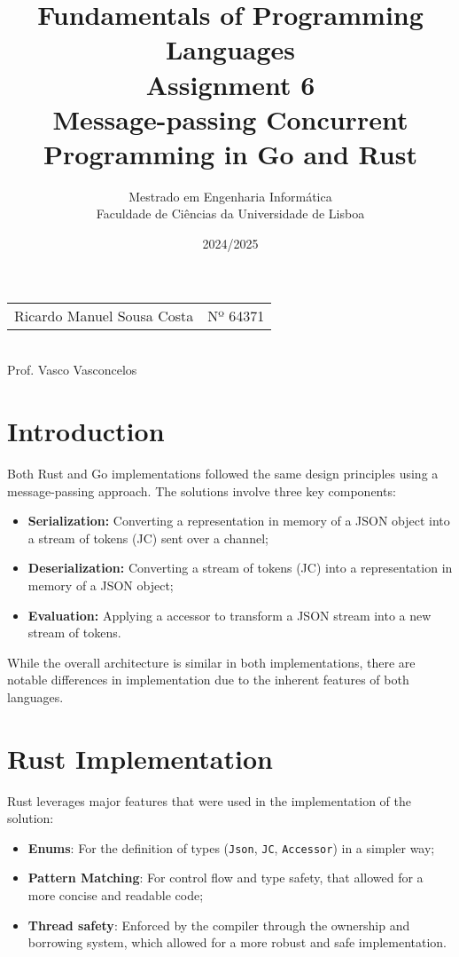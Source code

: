 \documentclass[a4paper]{article}
\title{
  Fundamentals of Programming Languages\\[1ex]
  Assignment 6\\[1ex]
  Message-passing Concurrent Programming in Go and Rust}
\author{Mestrado em Engenharia Informática\\
  Faculdade de Ciências da Universidade de Lisboa
}
\date{2024/2025}
\begin{document}
\maketitle
\setlength{\parskip}{1ex}
\thispagestyle{empty}

\begin{center}

\begin{tabular}{rl}
    Ricardo Manuel Sousa Costa & Nº 64371\\[5mm]
\end{tabular}\\

Prof. Vasco Vasconcelos

\end{center}

\clearpage

\section{Introduction}

Both Rust and Go implementations followed the same design principles using a message-passing approach.
The solutions involve three key components:

\begin{itemize}
    \item \textbf{Serialization:} Converting a representation in memory of a JSON object into a stream of tokens (JC) sent over a channel;
    \item \textbf{Deserialization:} Converting a stream of tokens (JC) into a representation in memory of a JSON object;
    \item \textbf{Evaluation:} Applying a accessor to transform a JSON stream into a new stream of tokens.
\end{itemize}

While the overall architecture is similar in both implementations, there are notable differences in implementation due to the inherent features of both languages.

\section{Rust Implementation}

Rust leverages major features that were used in the implementation of the solution:

\begin{itemize}
    \item \textbf{Enums}: For the definition of types (\texttt{Json}, \texttt{JC}, \texttt{Accessor}) in a simpler way;
    \item \textbf{Pattern Matching}: For control flow and type safety, that allowed for a more concise and readable code;
    \item \textbf{Thread safety}: Enforced by the compiler through the ownership and borrowing system, which allowed for a more robust and safe implementation.
\end{itemize}
\end{document}
